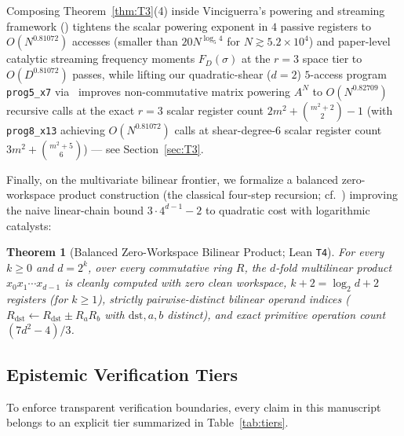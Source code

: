 \documentclass[11pt,reqno]{amsart}
\newtheorem{theorem}{Theorem}[section]
\theoremstyle{definition}
\begin{document}
Composing Theorem~\ref{thm:T3}(4) inside Vinciguerra's powering and streaming framework (\cite[Corollaries~4.3.1 and~5.1.1]{Vinciguerra2026}) tightens the scalar powering exponent in $4$ passive registers to $O(N^{0.81072})$ accesses (smaller than $20 N^{\log_5 4}$ for $N \gtrsim 5.2 \times 10^4$) and paper-level catalytic streaming frequency moments $F_D(\sigma)$ at the $r = 3$ space tier to $O(D^{0.81072})$ passes, while lifting our quadratic-shear ($d = 2$) $5$-access program \texttt{prog5\_x7} via~\cite[\S4.4, Theorem~5.2]{Vinciguerra2026} improves non-commutative matrix powering $A^N$ to $O(N^{0.82709})$ recursive calls at the exact $r = 3$ scalar register count $2m^2 + \binom{m^2+2}{2} - 1$ (with \texttt{prog8\_x13} achieving $O(N^{0.81072})$ calls at shear-degree-$6$ scalar register count $3m^2 + \binom{m^2+5}{6}$) --- see Section~\ref{sec:T3}.

Finally, on the multivariate bilinear frontier, we formalize a balanced zero-workspace product construction (the classical four-step recursion; cf.~\cite{BenOrCleve1992}) improving the naive linear-chain bound $3\cdot 4^{d-1}-2$ to quadratic cost with logarithmic catalysts:

\begin{theorem}[Balanced Zero-Workspace Bilinear Product; Lean \texttt{T4}]
\label{thm:T4}
For every $k \ge 0$ and $d = 2^k$, over every commutative ring $R$, the $d$-fold multilinear product $x_0 x_1 \cdots x_{d-1}$ is cleanly computed with zero clean workspace, $k + 2 = \log_2 d + 2$ registers (for $k \ge 1$), strictly pairwise-distinct bilinear operand indices ($R_{\mathrm{dst}} \leftarrow R_{\mathrm{dst}} \pm R_a R_b$ with $\mathrm{dst}, a, b$ distinct), and exact primitive operation count $(7 d^2 - 4)/3$.
\end{theorem}

\subsection{Epistemic Verification Tiers}

To enforce transparent verification boundaries, every claim in this manuscript belongs to an explicit tier summarized in Table~\ref{tab:tiers}.
\end{document}
